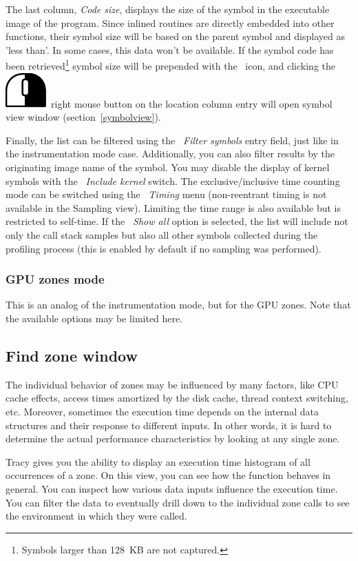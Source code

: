 \documentclass[hidelinks,titlepage,a4paper]{article}
\newcommand{\RMB}{\includegraphics[height=.8\baselineskip]{icons/rmb}}
\begin{document}
The last column, \emph{Code size}, displays the size of the symbol in the executable image of the program. Since inlined routines are directly embedded into other functions, their symbol size will be based on the parent symbol and displayed as 'less than'. In some cases, this data won't be available. If the symbol code has been retrieved\footnote{Symbols larger than 128~KB are not captured.} symbol size will be prepended with the \texttt{\faDatabase}~icon, and clicking the \RMB{}~right mouse button on the location column entry will open symbol view window (section~\ref{symbolview}).

Finally, the list can be filtered using the \emph{\faFilter{}~Filter symbols} entry field, just like in the instrumentation mode case. Additionally, you can also filter results by the originating image name of the symbol. You may disable the display of kernel symbols with the \emph{\faHatWizard{}~Include kernel} switch. The exclusive/inclusive time counting mode can be switched using the \emph{~Timing} menu (non-reentrant timing is not available in the Sampling view). Limiting the time range is also available but is restricted to self-time. If the \emph{\faPuzzlePiece{}~Show all} option is selected, the list will include not only the call stack samples but also all other symbols collected during the profiling process (this is enabled by default if no sampling was performed).

\subsubsection{GPU zones mode}

This is an analog of the instrumentation mode, but for the GPU zones. Note that the available options may be limited here.

\subsection{Find zone window}
\label{findzone}

The individual behavior of zones may be influenced by many factors, like CPU cache effects, access times amortized by the disk cache, thread context switching, etc. Moreover, sometimes the execution time depends on the internal data structures and their response to different inputs. In other words, it is hard to determine the actual performance characteristics by looking at any single zone.

Tracy gives you the ability to display an execution time histogram of all occurrences of a zone. On this view, you can see how the function behaves in general. You can inspect how various data inputs influence the execution time. You can filter the data to eventually drill down to the individual zone calls to see the environment in which they were called.
\end{document}
